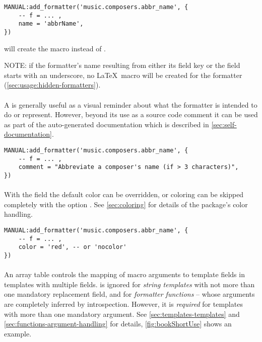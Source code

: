 \documentclass[12pt]{scrartcl}
\begin{document}
\begin{verbatim}
MANUAL:add_formatter('music.composers.abbr_name', {
	-- f = ... ,
	name = 'abbrName',
})
\end{verbatim}

\noindent will create the macro  instead of .

NOTE: if the formatter's name resulting from either its field key or the
 field starts with an underscore, no \LaTeX\ macro will be created
for the formatter (\vref{sec:usage:hidden-formatters}).


\paragraph{}

A  is generally useful as a visual reminder about what the
formatter is intended to do or represent.  However, beyond its use as a source
code comment it can be used as part of the auto-generated documentation which is
described in \vref{sec:self-documentation}.

\begin{verbatim}
MANUAL:add_formatter('music.composers.abbr_name', {
	-- f = ... ,
	comment = "Abbreviate a composer's name (if > 3 characters)",
})
\end{verbatim}


\paragraph{}

With the  field the default color can be overridden, or coloring
can be skipped completely with the option .  See
\vref{sec:coloring} for details of the package's color handling.

\begin{verbatim}
MANUAL:add_formatter('music.composers.abbr_name', {
	-- f = ... ,
	color = 'red', -- or 'nocolor'
})
\end{verbatim}


\paragraph{}

An array table  controls the mapping of macro arguments to template
fields in templates with multiple fields.   is ignored for \emph{string templates} with not more than one mandatory replacement field, and for \emph{formatter functions} -- whose arguments are completely inferred by
introspection.  However, it is \emph{required} for templates with more than one mandatory argument.  See \vref{sec:templates-templates} and
\vref{sec:functions-argument-handling} for details, \vref{fig:bookShortUse} shows an example.
\end{document}
